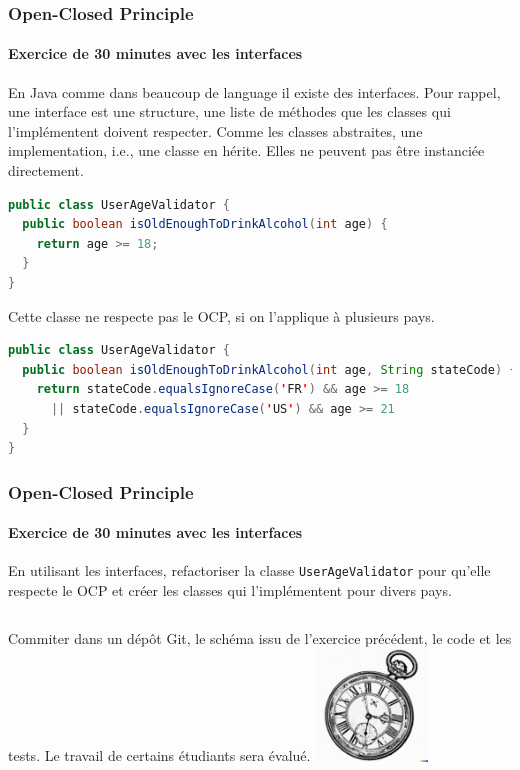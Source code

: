 \documentclass{beamer}
\begin{document}
    \begin{frame}[fragile]
        \transdissolve
        \frametitle{Open-Closed Principle}
        \framesubtitle{Exercice \execcounterdispinc{} de 30 minutes avec les interfaces}
        En Java comme dans beaucoup de language il existe des interfaces.
        Pour rappel, une interface est une structure, une liste de méthodes que les classes qui l'implémentent doivent respecter.
        Comme les classes abstraites, une implementation, i.e., une classe en hérite.
        Elles ne peuvent pas être instanciée directement.
        \begin{lstlisting}[language=java]
public class UserAgeValidator {
  public boolean isOldEnoughToDrinkAlcohol(int age) {
    return age >= 18;
  }
}
        \end{lstlisting}
        Cette classe ne respecte pas le OCP, si on l'applique à plusieurs pays.
        \begin{lstlisting}[language=java]
public class UserAgeValidator {
  public boolean isOldEnoughToDrinkAlcohol(int age, String stateCode) {
    return stateCode.equalsIgnoreCase('FR') && age >= 18
      || stateCode.equalsIgnoreCase('US') && age >= 21
  }
}
        \end{lstlisting}
    \end{frame}

    \begin{frame}
        \transdissolve
        \frametitle{Open-Closed Principle}
        \framesubtitle{Exercice \execcounterdispinc{} de 30 minutes avec les interfaces}
        En utilisant les interfaces, refactoriser la classe \lstinline{UserAgeValidator} pour qu'elle respecte le OCP et créer les classes qui l'implémentent pour divers pays.
        \bigbreak
        \begin{columns}
            Commiter dans un dépôt Git, le schéma issu de l'exercice précédent, le code et les tests.
            \bigbreak
            Le travail de certains étudiants sera évalué.
            \centering
            \includegraphics[width=3cm]{image/engraving-of-an-old-watch}
        \end{columns}
    \end{frame}
\end{document}
